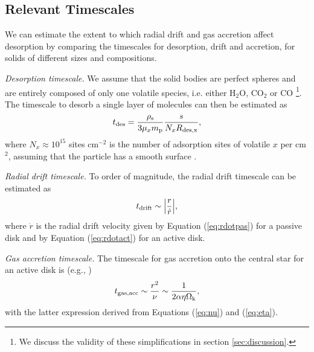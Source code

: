 \documentclass[apj]{emulateapj}
\newcommand{\emgr}[1]{\emph{ \color{gray} #1}}
\begin{document}

\subsection{Relevant Timescales}
\label{sec:timescales}

We can estimate the extent to which radial drift and gas accretion affect desorption by comparing the timescales for desorption, drift and accretion, for solids of different sizes and compositions. 

\textit{Desorption timescale.} We assume that the solid bodies are perfect spheres and are entirely composed of only one volatile species, i.e. either H$_2$O, CO$_2$ or CO \footnote{We discuss the validity of these simplifications in section \ref{sec:discussion}.}. The timescale to desorb a single layer of molecules can then be estimated as
\begin{equation}
\label{eq:tdes}
t_{\rm des}=\frac{\rho_{\rm s}}{3 \mu_x m_{\rm p}} \frac{s}{N_x R_{\rm des, x}},
\end{equation}
where $N_x \approx 10^{15}$ sites cm$^{-2}$ is the number of adsorption sites of volatile $x$ per cm$^2$, assuming that the particle has a smooth surface \citep{hollenbach09}. 

\textit{Radial drift timescale.} To order of magnitude, the radial drift timescale can be estimated as 
\begin{equation}
\label{eq:tdrift}
t_{\rm drift} \sim \Big|\frac{r}{\dot{r}}\Big|,
\end{equation}
where $\dot{r}$ is the radial drift velocity given by Equation (\ref{eq:rdotpas}) for a passive disk and by Equation (\ref{eq:rdotact}) for an active disk.

\textit{Gas accretion timescale.} The timescale for gas accretion onto the central star for an active disk is (e.g., \citealt{armitage10})
\begin{equation}
\label{eq:tgas}
t_{\rm gas, acc} \sim \frac{r^2}{\nu} \sim \frac{1}{2 \alpha \eta \Omega_{\rm k}},
\end{equation}
with the latter expression derived from Equations (\ref{eq:nu}) and (\ref{eq:eta}).
\end{document}
